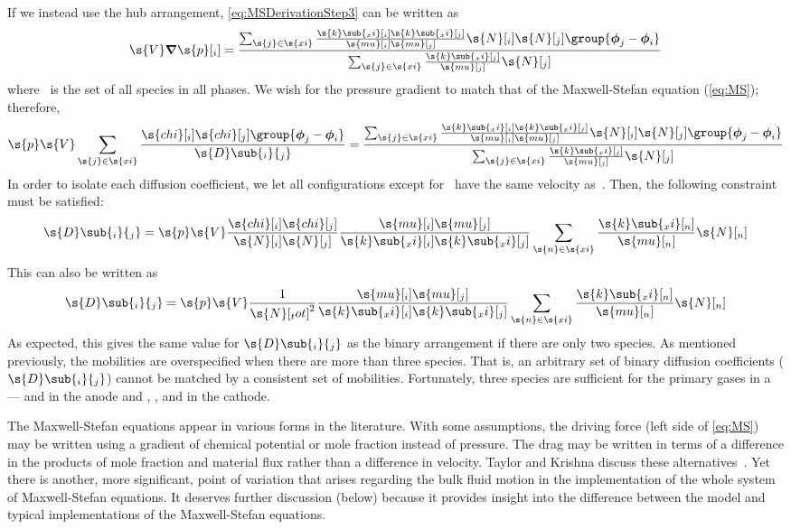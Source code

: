 If we instead use the hub arrangement,  \autoref{eq:MSDerivationStep3} can be written as
\begin{equation}
  \s{V}\boldsymbol{\nabla}\s{p}[_i] = \frac{\sum_{\s{j} \in \s{xi}}\frac{\s{k}\sub{_xi}[_i]\s{k}\sub{_xi}[_j]}{\s{mu}[_i]\s{mu}[_j]}\s{N}[_i]\s{N}[_j]\group{\boldsymbol{\phi}_j - \boldsymbol{\phi}_i}}{\sum_{\s{j} \in \s{xi}}\frac{\s{k}\sub{_xi}[_j]}{\s{mu}[_j]}\s{N}[_j]}
\end{equation}
where ~is the set of all species in all phases.  We wish for the pressure gradient to match that of the Maxwell-Stefan equation (\ref{eq:MS}); therefore,
\begin{equation}
  \s{p}\s{V}\sum_{\s{j} \in \s{xi}}\frac{\s{chi}[_i]\s{chi}[_j]\group{\boldsymbol{\phi}_j - \boldsymbol{\phi}_i}}{\s{D}\sub{_i}{_j}} = \frac{\sum_{\s{j} \in \s{xi}}\frac{\s{k}\sub{_xi}[_i]\s{k}\sub{_xi}[_j]}{\s{mu}[_i]\s{mu}[_j]}\s{N}[_i]\s{N}[_j]\group{\boldsymbol{\phi}_j - \boldsymbol{\phi}_i}}{\sum_{\s{j} \in \s{xi}}\frac{\s{k}\sub{_xi}[_j]}{\s{mu}[_j]}\s{N}[_j]}
\end{equation}
In order to isolate each diffusion coefficient, we let all configurations except for~ have the same velocity as~.  Then, the following constraint must be satisfied:
\begin{equation}
  \s{D}\sub{_i}{_j} = \s{p}\s{V}\frac{\s{chi}[_i]\s{chi}[_j]}{\s{N}[_i]\s{N}[_j]}\frac{\s{mu}[_i]\s{mu}[_j]}{\s{k}\sub{_xi}[_i]\s{k}\sub{_xi}[_j]}\sum_{\s{n} \in \s{xi}}\frac{\s{k}\sub{_xi}[_n]}{\s{mu}[_n]}\s{N}[_n]
\end{equation}
This can also be written as
\begin{equation}
  \s{D}\sub{_i}{_j} = \s{p}\s{V}\frac{1}{\s{N}[_tot]^2}\frac{\s{mu}[_i]\s{mu}[_j]}{\s{k}\sub{_xi}[_i]\s{k}\sub{_xi}[_j]}\sum_{\s{n} \in \s{xi}}\frac{\s{k}\sub{_xi}[_n]}{\s{mu}[_n]}\s{N}[_n]
\end{equation}
As expected, this gives the same value for $\s{D}\sub{_i}{_j}$ as the binary arrangement if there are only two species.  As mentioned previously, the mobilities are overspecified when there are more than three species.  That is, an arbitrary set of binary diffusion coefficients ($\s{D}\sub{_i}{_j}$) cannot be matched by a consistent set of mobilities.  Fortunately, three species are sufficient for the primary gases in a --- and  in the anode and , , and  in the cathode.

The Maxwell-Stefan equations appear in various forms in the literature.  With some assumptions, the driving force (left side of \autoref{eq:MS}) may be written using a gradient of chemical potential or mole fraction instead of pressure.  The drag may be written in terms of a difference in the products of mole fraction and material flux rather than a difference in velocity.  Taylor and Krishna discuss these alternatives~\cite{Taylor1993}.  Yet there is another, more significant, point of variation that arises regarding the bulk fluid motion in the implementation of the whole system of Maxwell-Stefan equations.  It deserves further discussion (below) because it provides insight into the difference between the model and typical implementations of the Maxwell-Stefan equations.


